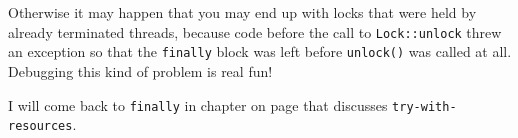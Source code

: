 Otherwise it may happen that you may end up with locks that were held by already terminated threads, because code before the call to \lstinline|Lock::unlock| threw an exception so that the \lstinline|finally| block was left before \lstinline|unlock()| was called at all. Debugging this kind of problem is real fun!

I will come back to \lstinline|finally| in chapter  on page \pageref{sec:TryWithResources} that discusses \texttt{try-with-resources}.

